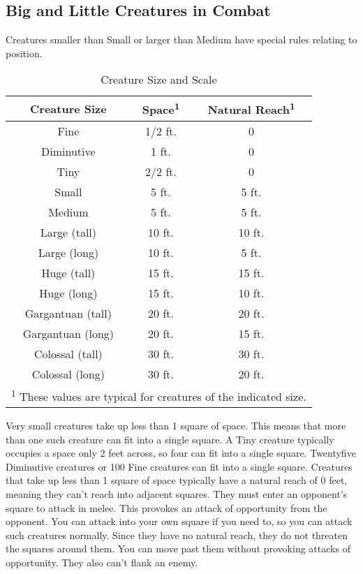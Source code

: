 \subsection{Big and Little Creatures in Combat}

Creatures smaller than Small or larger than Medium have special rules relating to position. 

\vspace*{10pt}

\begin{wraptable}{O}{3in}
\caption{Creature Size and Scale}
\begin{tabular}[h]{c|c|c}
Creature Size & Space\textsuperscript{1} &	Natural Reach\textsuperscript{1} \\ \hline
Fine & 1/2 ft. & 0 \\
Diminutive & 1 ft. & 0 \\
Tiny & 2\textendash1/2 ft. & 0 \\
Small & 5 ft. & 5 ft.	\\
Medium & 5 ft. & 5 ft. \\
Large (tall) & 10 ft. & 10 ft. \\
Large (long) & 10 ft. & 5 ft. \\
Huge (tall) & 15 ft. & 15 ft. \\
Huge (long) & 15 ft. & 10 ft. \\
Gargantuan (tall) & 20 ft. & 20 ft. \\
Gargantuan (long) & 20 ft. & 15 ft.	\\
Colossal (tall) & 30 ft. & 30 ft. \\
Colossal (long) & 30 ft. & 20 ft. \\ \hline
\multicolumn{3}{p{3in}}{\textsuperscript{1} These values are typical for creatures of the indicated size.}
\end{tabular}
\end{wraptable}

 Very small creatures take up less than 1 square of space. This means that more than one such creature can fit into a single square. A Tiny creature typically occupies a space only 2 \half feet across, so four can fit into a single square. Twenty\textendash five Diminutive creatures or 100 Fine creatures can fit into a single square. Creatures that take up less than 1 square of space typically have a natural reach of 0 feet, meaning they can't reach into adjacent squares. They must enter an opponent's square to attack in melee. This provokes an attack of opportunity from the opponent. You can attack into your own square if you need to, so you can attack such creatures normally. Since they have no natural reach, they do not threaten the squares around them. You can move past them without provoking attacks of opportunity. They also can't flank an enemy.

